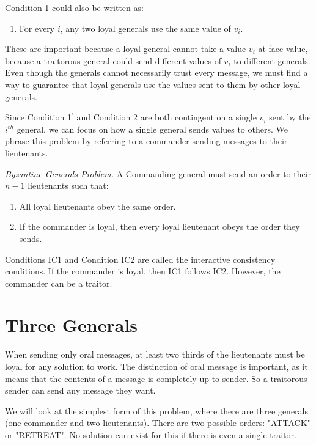 \documentclass[10pt]{amsart}
\begin{document}
\noindent Condition 1 could also be written as:
\begin{enumerate}[label={1$^{\prime}$.}]
    \item For every $i$, any two loyal generals use the same value of $v_i$.
\end{enumerate}

These are important because a loyal general cannot take a value $v_i$ at face value, because a
traitorous general could send different values of $v_i$ to different generals. Even though the
generals cannot necessarily trust every message, we must find a way to guarantee that loyal generals
use the values sent to them by other loyal generals.

Since Condition 1$^\prime$ and Condition 2 are both contingent on a single $v_i$ sent by the $i^{th}$
general, we can focus on how a single general sends values to others. We phrase this problem by 
referring to a commander sending messages to their lieutenants.

\emph{Byzantine Generals Problem.} A Commanding general must send an order to their $n - 1$ 
lieutenants such that:

\begin{enumerate}[label={IC\arabic{enumi}.}]
    \item All loyal lieutenants obey the same order.
    \item If the commander is loyal, then every loyal lieutenant obeys the order they sends.
\end{enumerate}

Conditions IC1 and Condition IC2 are called the interactive consistency conditions. If the commander
is loyal, then IC1 follows IC2. However, the commander can be a traitor.

\section{Three Generals}

When sending only oral messages, at least two thirds of the lieutenants must be loyal for any
solution to work. The distinction of oral message is important, as it means that the contents of a
message is completely up to sender. So a traitorous sender can send any message they want.

We will look at the simplest form of this problem, where there are three generals (one commander and
two lieutenants). There are two possible orders: "ATTACK" or "RETREAT". No solution can exist for
this if there is even a single traitor.
\end{document}
